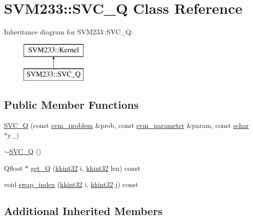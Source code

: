\hypertarget{class_s_v_m233_1_1_s_v_c___q}{}\section{S\+V\+M233\+:\+:S\+V\+C\+\_\+Q Class Reference}
\label{class_s_v_m233_1_1_s_v_c___q}
Inheritance diagram for S\+V\+M233\+:\+:S\+V\+C\+\_\+Q\+:\begin{figure}[H]
\begin{center}
\leavevmode
\includegraphics[height=2.000000cm]{class_s_v_m233_1_1_s_v_c___q}
\end{center}
\end{figure}
\subsection*{Public Member Functions}
\begin{DoxyCompactItemize}
\item 
\hyperlink{class_s_v_m233_1_1_s_v_c___q_a8a37812aeded4c347e0081549f0440a5}{S\+V\+C\+\_\+Q} (const \hyperlink{struct_s_v_m233_1_1svm__problem}{svm\+\_\+problem} \&prob, const \hyperlink{struct_s_v_m233_1_1svm__parameter}{svm\+\_\+parameter} \&param, const \hyperlink{namespace_s_v_m233_afb4ec48497a25626275d52266ac9d7d8}{schar} $\ast$y\+\_\+)
\item 
\hyperlink{class_s_v_m233_1_1_s_v_c___q_a1f5e070c10fdfe1aca390791edabe493}{$\sim$\+S\+V\+C\+\_\+Q} ()
\item 
Qfloat $\ast$ \hyperlink{class_s_v_m233_1_1_s_v_c___q_a2b743c7ff062c031ffdf183e281c04d3}{get\+\_\+Q} (\hyperlink{namespace_k_k_b_a8fa4952cc84fda1de4bec1fbdd8d5b1b}{kkint32} i, \hyperlink{namespace_k_k_b_a8fa4952cc84fda1de4bec1fbdd8d5b1b}{kkint32} len) const 
\item 
void \hyperlink{class_s_v_m233_1_1_s_v_c___q_adc819335959ad0cc2012e41e1ebc3e8d}{swap\+\_\+index} (\hyperlink{namespace_k_k_b_a8fa4952cc84fda1de4bec1fbdd8d5b1b}{kkint32} i, \hyperlink{namespace_k_k_b_a8fa4952cc84fda1de4bec1fbdd8d5b1b}{kkint32} j) const 
\end{DoxyCompactItemize}
\subsection*{Additional Inherited Members}


